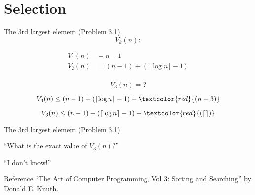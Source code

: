 \section{Selection}

\begin{frame}{The $3$rd largest element (Problem 3.1)}
  \[
	V_k(n): \text{}
  \]

  \pause
  \begin{align*}
	V_1(n) &= n - 1 \\
	V_2(n) &= (n - 1) + (\lceil \log n \rceil - 1) \\
  \end{align*}

  \pause
  \[
	V_3(n) = ?
  \]

  \pause
  \[
	V_3(n) \le (n - 1) + (\lceil \log n \rceil - 1) + \textcolor{red}{(n - 3)}
  \]

  \pause
  \[
	V_3(n) \le (n - 1) + (\lceil \log n \rceil - 1) + \textcolor{red}{(\lceil \rceil)} 
  \]
\end{frame}
\begin{frame}{The 3rd largest element (Problem 3.1)}
  \begin{center}
	``What is the exact value of $V_3(n)$?'' \\[0.30cm] \pause

	``I don't know!''  
  \end{center}

  \pause
  \begin{alertblock}{Reference}
	``The Art of Computer Programming, Vol 3: Sorting and Searching'' by Donald E. Knuth.
  \end{alertblock}
\end{frame}
